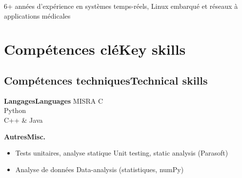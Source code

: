 \vspace{-1.cm}

\ifnativelang
\newcommand{\CVheader}{6+ ann\'ees d'exp\'erience en syst\`emes temps-r\'eels, Linux embarqu\'e et r\'eseaux \`a applications m\'edicales}
\else
\newcommand{\CVheader}{6+ years of experience in Real-Time systems, embedded linux and networking.\\
Experience in project steering and team management.}
\fi

\begin{center}
\textcolor{color1}{\Large{\CVheader}}
\end{center}

\section{\ifnativelang Comp\'etences cl\'e\else Key skills\fi}
\subsection{\ifnativelang Comp\'etences techniques\else Technical skills\fi}

{\ifnativelang\textbf{Langages}\else \textbf{Languages}\fi}{
 MISRA C\\
 Python \\
 C++ \& Java
}

\vspace{\ItemsSpacing}

{\textbf{\ifnativelang Autres\else Misc.\fi}}{
\begin{itemize}
\item \ifnativelang Tests unitaires, analyse statique \else Unit testing, static analysis \fi (Parasoft)
\item \ifnativelang Analyse de donn\'ees \else Data-analysis \fi (statistiques, numPy)
\end{itemize}
}



